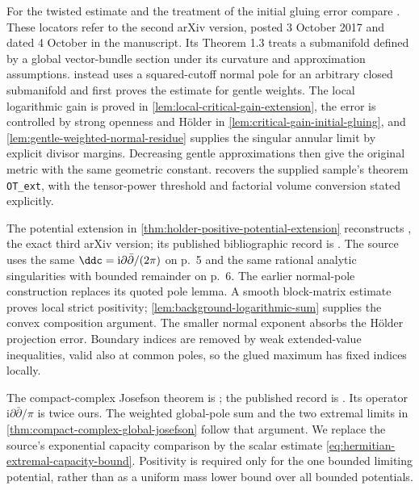For the twisted estimate and the treatment of the initial gluing error compare \cite[Section 2, pp.~5--9, and Appendix, pp.~14--15]{Cao2017v2}. These locators refer to the second arXiv version, posted 3 October 2017 and dated 4 October in the manuscript. Its Theorem 1.3 treats a submanifold defined by a global vector-bundle section under its curvature and approximation assumptions.  instead uses a squared-cutoff normal pole for an arbitrary closed submanifold and first proves the estimate for gentle weights. The local logarithmic gain is proved in \cref{lem:local-critical-gain-extension}, the error is controlled by strong openness and H\"older in \cref{lem:critical-gain-initial-gluing}, and \cref{lem:gentle-weighted-normal-residue} supplies the singular annular limit by explicit divisor margins. Decreasing gentle approximations then give the original metric with the same geometric constant.  recovers the supplied sample's theorem \texttt{OT\_ext}, with the tensor-power threshold and factorial volume conversion stated explicitly.

The potential extension in \cref{thm:holder-positive-potential-extension} reconstructs \cite[Theorem 6.1 and complete proof, Lemma 6.2, pp.~19--22]{DRWNXZ2026v3}, the exact third arXiv version; its published bibliographic record is \cite{DRWNXZ}. The source uses the same $\ddc=\mathrm i\partial\bar\partial/(2\pi)$ on p.~5 and the same rational analytic singularities with bounded remainder on p.~6. The earlier normal-pole construction replaces its quoted pole lemma. A smooth block-matrix estimate proves local strict positivity; \cref{lem:background-logarithmic-sum} supplies the convex composition argument. The smaller normal exponent absorbs the H\"older projection error. Boundary indices are removed by weak extended-value inequalities, valid also at common poles, so the glued maximum has fixed indices locally.

The compact-complex Josefson theorem is \cite[Theorem 1.1 and proof, pp.~8--9]{Vu2018v1}; the published record is \cite{Vu19}. Its operator $\mathrm i\partial\bar\partial/\pi$ is twice ours. The weighted global-pole sum and the two extremal limits in \cref{thm:compact-complex-global-josefson} follow that argument. We replace the source's exponential capacity comparison by the scalar estimate \eqref{eq:hermitian-extremal-capacity-bound}. Positivity is required only for the one bounded limiting potential, rather than as a uniform mass lower bound over all bounded potentials.

